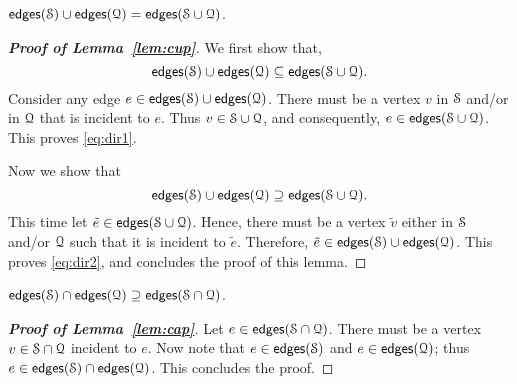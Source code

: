 \documentclass[conference]{IEEEtran}
\begin{document}
\begin{lemma} $\mathsf{edges}(\mathcal{S})  \cup \mathsf{edges}(\mathcal{Q}) = \mathsf{edges}(\mathcal{S} \cup \mathcal{Q})$.
  \label{lem:cup}
\end{lemma}
\vspace{0.2cm}
\begin{proof}[\bfseries Proof of Lemma~\ref{lem:cup}]
     We first show that,
	 \begin{equation}
	   \mathsf{edges}(\mathcal{S}) \cup \mathsf{edges}(\mathcal{Q}) \subseteq \mathsf{edges}(\mathcal{S} \cup \mathcal{Q}).
	   \label{eq:dir1}
	 \end{equation}
	 Consider any edge $e \in \mathsf{edges}(\mathcal{S}) \cup \mathsf{edges}(\mathcal{Q})$.
	 There must be a vertex $v$ in $\mathcal{S}$ and/or in $\mathcal{Q}$
	 that is incident to $e$. Thus $v \in \mathcal{S} \cup \mathcal{Q}$, and consequently, $e \in \mathsf{edges}(\mathcal{S} \cup \mathcal{Q})$.
	 This proves \eqref{eq:dir1}.

	 Now we show that
	 \begin{equation}
	   \mathsf{edges}(\mathcal{S}) \cup \mathsf{edges}(\mathcal{Q}) \supseteq \mathsf{edges}(\mathcal{S} \cup \mathcal{Q}).
	   \label{eq:dir2}
	 \end{equation}
	 This time let $\tilde{e} \in \mathsf{edges}(\mathcal{S} \cup \mathcal{Q})$. Hence, there must be
	 a vertex $\tilde{v}$ either in $\mathcal{S}$ and/or $\mathcal{Q}$ such that it is
	 incident to
	 $\tilde{e}$. Therefore, $\tilde{e} \in \mathsf{edges}(\mathcal{S}) \cup \mathsf{edges}(\mathcal{Q})$. This
	 proves \eqref{eq:dir2}, and concludes the proof of this lemma.
\end{proof}
\vspace{0.5cm}
\begin{lemma}
   $\mathsf{edges}(\mathcal{S})  \cap \mathsf{edges}(\mathcal{Q}) \supseteq  \mathsf{edges}(\mathcal{S} \cap
   \mathcal{Q})$.
  \label{lem:cap}
\end{lemma}
\vspace{0.2cm}
\begin{proof}[\bfseries Proof of Lemma~\ref{lem:cap}]
 Let $e \in \mathsf{edges}(\mathcal{S} \cap \mathcal{Q})$. There must be a vertex $v \in \mathcal{S} \cap
 \mathcal{Q}$ incident to $e$. Now note that $e \in \mathsf{edges}(\mathcal{S})$ and $e \in \mathsf{edges}(\mathcal{Q})$; thus
 $e \in \mathsf{edges}(\mathcal{S}) \cap \mathsf{edges}(\mathcal{Q})$. This concludes the proof.
\end{proof}
\vspace{0.5cm}
\end{document}
